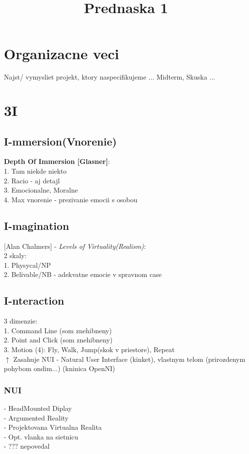 \documentclass[]{article}
\title{Prednaska 1}
\author{}
\begin{document}
\maketitle

\section{Organizacne veci}
Najst/ vymysliet projekt, ktory naspecifikujeme ...
Midterm, Skuska ...


\section{3I}

\subsection{I-mmersion(Vnorenie)}
\textbf{Depth Of Immersion [Glasner]}:\\
1. Tam niekde niekto \\
2. Racio - aj detajl \\
3. Emocionalne, Moralne \\
4. Max vnorenie - prezivanie emocii s osobou \\


\subsection{I-magination}
[Alan Chalmers] - \textit{Levels of Virtuality(Realism)}: \\
2 skaly: \\
1. Physycal/NP \\
2. Belivable/NB - adekvatne emocie v spravnom case\\

\subsection{I-nteraction}
3 dimenzie: \\
1. Command Line  (som znehibneny)\\
2. Point and Click  (som znehibneny)\\
3. Motion (4): Fly, Walk, Jump(skok v priestore), Repeat \\
$\uparrow$
Zasahuje NUI - Natural User Interface (kinket), vlastnym telom (prirozdenym pohybom ondim...)
(kninica OpenNI)


\subsubsection{NUI} 
- HeadMounted Diplay \\
- Argumented Reality \\
- Projektovana Virtualna Realita \\
- Opt. vlanka na sietnicu \\
- ??? nepovedal \\
\end{document}

